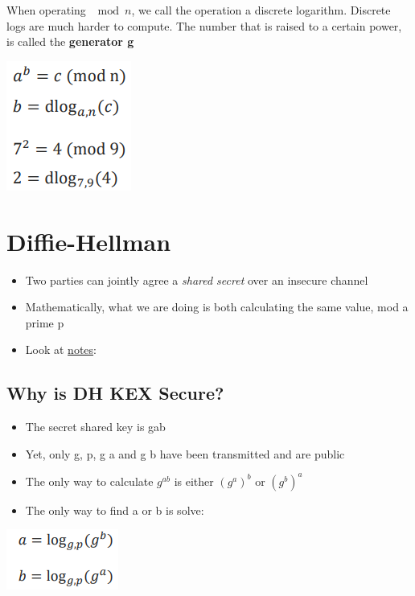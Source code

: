 \documentclass{article}
\begin{document}
\begin{flushleft}
When operating $\mod n$, we call the operation a discrete logarithm. Discrete logs are much harder to compute. The number that is raised to a certain power, is called the \textbf{generator g}
\end{flushleft}

\begin{center}
  \includegraphics[scale=0.5]{dlog.png}
\end{center}

\section{Diffie-Hellman}
\begin{itemize}
  \item Two parties can jointly agree a \textit{shared secret} over an insecure channel 
  \item Mathematically, what we are doing is both calculating the same value, mod a prime p
  \item Look at \href{https://moodle.nottingham.ac.uk/pluginfile.php/5121129/mod_resource/content/0/L5%20-%20Cryptography%20III%202pp.pdf}{notes}:
\end{itemize}

\subsection{Why is DH KEX Secure?}
\begin{itemize}
  \item The secret shared key is gab 
  \item Yet, only g, p, g a and g b have been transmitted and are public 
  \item The only way to calculate $g^{ab}$ is either $(g^a)^b$ or $(g^b)^a$ 
  \item The only way to find a or b is solve:
\end{itemize}

\begin{center}
  \includegraphics[scale=0.5]{solver.png}
\end{center}
\end{document}
